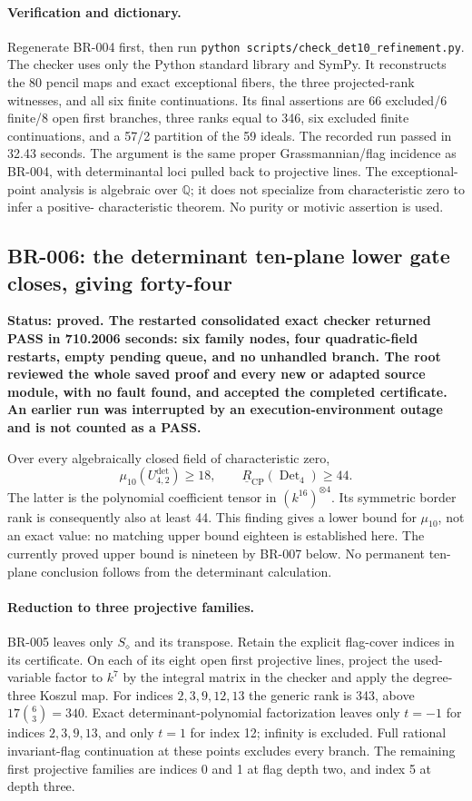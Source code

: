 \paragraph{Verification and dictionary.}
Regenerate BR-004 first, then run
\texttt{python scripts/check\_det10\_refinement.py}.
The checker uses only the Python standard library and SymPy.  It
reconstructs the 80 pencil maps and exact exceptional fibers, the
three projected-rank witnesses, and all six finite continuations.
Its final assertions are 66 excluded/6 finite/8 open first branches,
three ranks equal to 346, six excluded finite continuations, and a
57/2 partition of the 59 ideals.  The recorded run passed in 32.43
seconds.  The argument is the same proper Grassmannian/flag incidence
as BR-004, with determinantal loci pulled back to projective lines.
The exceptional-point analysis is algebraic over $\mathbb Q$; it
does not specialize from characteristic zero to infer a positive-
characteristic theorem.  No purity or motivic assertion is used.

\subsection*{BR-006: the determinant ten-plane lower gate closes, giving forty-four}
\textbf{Status: proved.  The restarted consolidated exact checker returned
PASS in 710.2006 seconds: six family nodes, four quadratic-field restarts,
empty pending queue, and no unhandled branch.  The root reviewed the whole
saved proof and every new or adapted source module, with no fault found,
and accepted the completed certificate.  An earlier run was interrupted
by an execution-environment outage and is not counted as a PASS.}

Over every algebraically closed field of characteristic zero,
\[
 \mu_{10}(U^{\mathrm{det}}_{4,2})\ge18,
 \qquad
 \underline R_{\mathrm{CP}}(\operatorname{Det}_4)\ge44.
\]
The latter is the polynomial coefficient tensor in $(k^{16})^{\otimes4}$.
Its symmetric border rank is consequently also at least 44.
This finding gives a lower bound for $\mu_{10}$, not an exact value:
no matching upper bound eighteen is established here.  The currently
proved upper bound is nineteen by BR-007 below.  No permanent ten-plane conclusion follows
from the determinant calculation.

\paragraph{Reduction to three projective families.}
BR-005 leaves only $S_\diamond$ and its transpose.  Retain the explicit
flag-cover indices in its certificate.  On each of its eight open first
projective lines, project the used-variable factor to $k^7$ by the
integral matrix in the checker and apply the degree-three Koszul map.
For indices $2,3,9,12,13$ the generic rank is 343, above
$17\binom63=340$.  Exact determinant-polynomial factorization leaves
only $t=-1$ for indices $2,3,9,13$, and only $t=1$ for index 12;
infinity is excluded.  Full rational invariant-flag continuation at
these points excludes every branch.  The remaining first projective
families are indices 0 and 1 at flag depth two, and index 5 at depth three.


